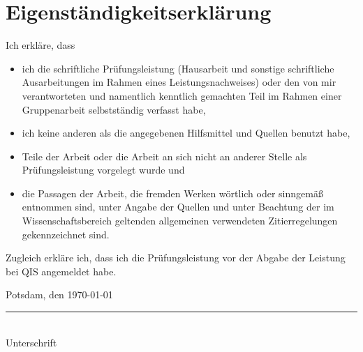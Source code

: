 \documentclass[
    a4paper,
    12pt,
    headinclude=true,
    BCOR=10mm,
]{scrreprt}
\begin{document}
\chapter*{Eigenständigkeitserklärung}
Ich erkläre, dass
\begin{itemize}
    \item ich die schriftliche Prüfungsleistung (Hausarbeit und sonstige schriftliche Ausarbeitungen im Rahmen eines Leistungsnachweises) oder den von mir verantworteten und namentlich kenntlich gemachten Teil im Rahmen einer Gruppenarbeit selbstständig verfasst habe,
    \item ich keine anderen als die angegebenen Hilfsmittel und Quellen benutzt habe,
    \item Teile der Arbeit oder die Arbeit an sich nicht an anderer Stelle als Prüfungsleistung vorgelegt wurde und
    \item die Passagen der Arbeit, die fremden Werken wörtlich oder sinngemäß entnommen sind, unter Angabe der Quellen und unter Beachtung der im Wissenschaftsbereich geltenden allgemeinen verwendeten Zitierregelungen gekennzeichnet sind.
\end{itemize}

Zugleich erkläre ich, dass ich die Prüfungsleistung vor der Abgabe der Leistung bei QIS angemeldet habe.

\vspace{2cm}

\noindent
Potsdam, den \today

\vspace{2cm}

\noindent
\rule{6cm}{0.4pt}\\
Unterschrift

\printbibliography
\newpage
\appendix
\end{document}

